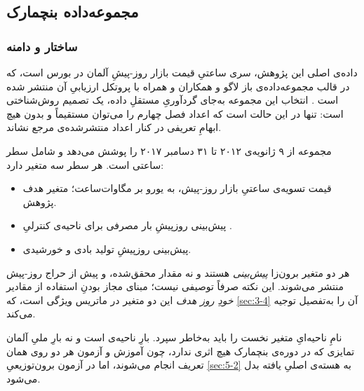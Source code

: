 
\subsection{مجموعه‌داده بنچمارک }
\label{sec:3-3-1}

\subsubsection*{ساختار و دامنه}

داده‌ی اصلی این پژوهش، سری ساعتیِ قیمت بازار روز-پیشِ آلمان در بورس  است،
که در قالب مجموعه‌داده‌ی باز لاگو و همکاران و همراه با پروتکل ارزیابیِ آن منتشر شده
است \cite{lago_forecasting_2021}. انتخاب این مجموعه به‌جای گردآوریِ مستقلِ داده، یک
تصمیم روش‌شناختی است: تنها در این حالت است که اعداد فصل چهارم را می‌توان مستقیماً و
بدون هیچ ابهامِ تعریفی در کنار اعداد منتشرشده‌ی مرجع نشاند.

مجموعه از ۹ ژانویه‌ی ۲۰۱۲ تا ۳۱ دسامبر ۲۰۱۷ را پوشش می‌دهد و شامل  سطر ساعتی
است. هر سطر سه متغیر دارد:

\begin{itemize}
  \item {}  قیمت تسویه‌ی ساعتیِ بازار روز-پیش، به یورو بر مگاوات‌ساعت؛
        متغیر هدف پژوهش.
  \item {}  پیش‌بینی روزپیشِ بار مصرفی برای ناحیه‌ی کنترلیِ
        .
  \item {}  پیش‌بینی روزپیشِ تولید بادی و خورشیدی.
\end{itemize}

هر دو متغیر برون‌زا \emph{پیش‌بینی} هستند و نه مقدار محقق‌شده، و پیش از حراج روز-پیش
منتشر می‌شوند. این نکته صرفاً توصیفی نیست؛ مبنای مجاز بودنِ استفاده از مقادیر
\emph{خودِ روز هدف} این دو متغیر در ماتریس ویژگی است، که \cref{sec:3-4} آن را به‌تفصیل
توجیه می‌کند.

نامِ ناحیه‌ایِ متغیر نخست را باید به‌خاطر سپرد.  بارِ ناحیه‌ی
 است و نه بارِ ملیِ آلمان  تمایزی که در دوره‌ی بنچمارک هیچ اثری
ندارد، چون آموزش و آزمون هر دو روی همان تعریف انجام می‌شوند، اما در آزمون
برون‌توزیعیِ \cref{sec:5-2} به هسته‌ی اصلیِ یافته بدل می‌شود.

